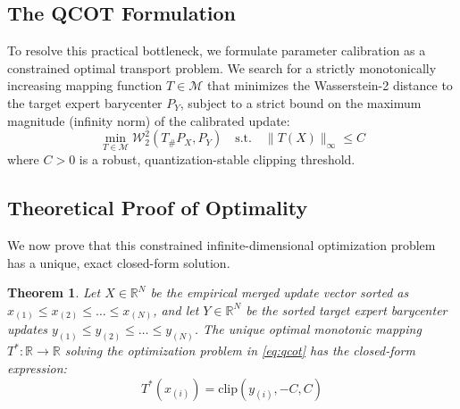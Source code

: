 \documentclass{article}
\theoremstyle{plain}
\newtheorem{theorem}{Theorem}[section]
\theoremstyle{definition}
\theoremstyle{remark}
\begin{document}
\subsection{The QCOT Formulation}
To resolve this practical bottleneck, we formulate parameter calibration as a constrained optimal transport problem. We search for a strictly monotonically increasing mapping function $T \in \mathcal{M}$ that minimizes the Wasserstein-2 distance to the target expert barycenter $P_Y$, subject to a strict bound on the maximum magnitude (infinity norm) of the calibrated update:
\begin{equation}
    \min_{T \in \mathcal{M}} \mathcal{W}_2^2(T_{\#} P_X, P_Y) \quad \text{s.t.} \quad \|T(X)\|_{\infty} \le C
    \label{eq:qcot}
\end{equation}
where $C > 0$ is a robust, quantization-stable clipping threshold.

\subsection{Theoretical Proof of Optimality}
We now prove that this constrained infinite-dimensional optimization problem has a unique, exact closed-form solution.

\begin{theorem}
Let $X \in \mathbb{R}^N$ be the empirical merged update vector sorted as $x_{(1)} \le x_{(2)} \le \dots \le x_{(N)}$, and let $Y \in \mathbb{R}^N$ be the sorted target expert barycenter updates $y_{(1)} \le y_{(2)} \le \dots \le y_{(N)}$. The unique optimal monotonic mapping $T^* : \mathbb{R} \to \mathbb{R}$ solving the optimization problem in \cref{eq:qcot} has the closed-form expression:
\begin{equation}
    T^*(x_{(i)}) = \text{clip}(y_{(i)}, -C, C)
\end{equation}
\label{thm:qcot}
\end{theorem}
\end{document}
